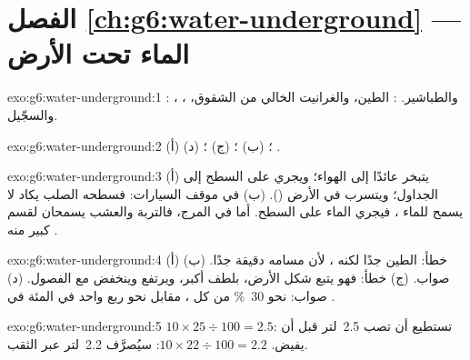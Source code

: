 \section*{الفصل \ref{ch:g6:water-underground} --- الماء تحت الأرض}

\begin{solution}{exo:g6:water-underground:1}
: ، ، والطباشير. : الطين، والغرانيت الخالي من الشقوق،
والسجّيل.
\end{solution}

\begin{solution}{exo:g6:water-underground:2}
(أ) ؛ (ب) ؛ (ج) ؛ (د) .
\end{solution}

\begin{solution}{exo:g6:water-underground:3}
(أ) يتبخر عائدًا إلى الهواء؛ ويجري على السطح إلى
الجداول؛ ويتسرب في الأرض (). (ب) في موقف السيارات: فسطحه
الصلب يكاد لا يسمح للماء ، فيجري الماء على السطح. أما في
المرج، فالتربة والعشب يسمحان لقسم كبير منه .
\end{solution}

\begin{solution}{exo:g6:water-underground:4}
(أ) خطأ: الطين  جدًا لكنه ، لأن مسامه دقيقة جدًا.
(ب) صواب. (ج) خطأ: فهو يتبع شكل الأرض، بلطف أكبر، ويرتفع
وينخفض مع الفصول. (د) صواب: نحو 30~\% من كل 
، مقابل نحو ربع واحد في المئة في .
\end{solution}

\begin{solution}{exo:g6:water-underground:5}
$10 \times 25 \div 100 = 2.5$: تستطيع أن تصب 2.5~لتر قبل أن يفيض.
$10 \times 22 \div 100 = 2.2$: سيُصرَّف 2.2~لتر عبر الثقب.
\end{solution}

